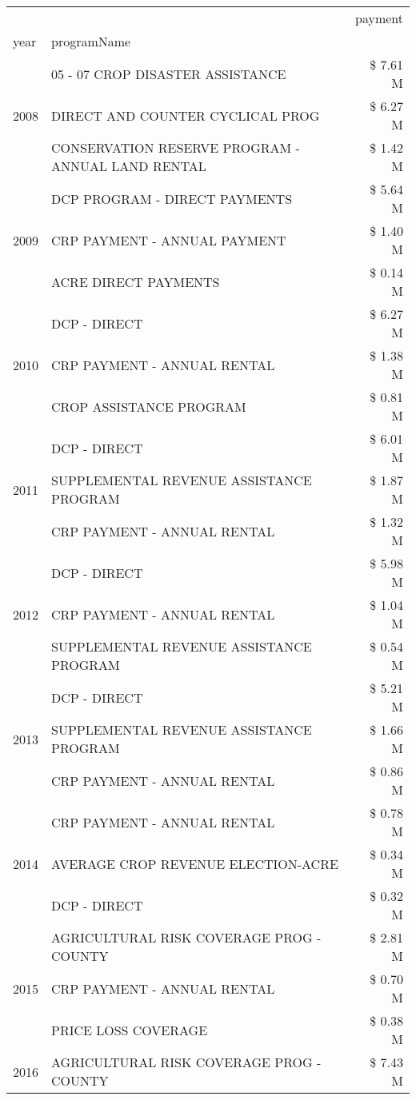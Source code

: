 \begin{tabular}{llr}
\toprule
 &  & payment \\
year & programName &  \\
\midrule
\multirow[t]{3}{*}{2008} & 05 - 07 CROP DISASTER ASSISTANCE & \$ 7.61 M \\
 & DIRECT AND COUNTER CYCLICAL PROG & \$ 6.27 M \\
 & CONSERVATION RESERVE PROGRAM - ANNUAL LAND RENTAL & \$ 1.42 M \\
\cline{1-3}
\multirow[t]{3}{*}{2009} & DCP PROGRAM - DIRECT PAYMENTS & \$ 5.64 M \\
 & CRP PAYMENT - ANNUAL PAYMENT & \$ 1.40 M \\
 & ACRE DIRECT PAYMENTS & \$ 0.14 M \\
\cline{1-3}
\multirow[t]{3}{*}{2010} & DCP - DIRECT & \$ 6.27 M \\
 & CRP PAYMENT - ANNUAL RENTAL & \$ 1.38 M \\
 & CROP ASSISTANCE PROGRAM & \$ 0.81 M \\
\cline{1-3}
\multirow[t]{3}{*}{2011} & DCP - DIRECT & \$ 6.01 M \\
 & SUPPLEMENTAL REVENUE ASSISTANCE PROGRAM & \$ 1.87 M \\
 & CRP PAYMENT - ANNUAL RENTAL & \$ 1.32 M \\
\cline{1-3}
\multirow[t]{3}{*}{2012} & DCP - DIRECT & \$ 5.98 M \\
 & CRP PAYMENT - ANNUAL RENTAL & \$ 1.04 M \\
 & SUPPLEMENTAL REVENUE ASSISTANCE PROGRAM & \$ 0.54 M \\
\cline{1-3}
\multirow[t]{3}{*}{2013} & DCP - DIRECT & \$ 5.21 M \\
 & SUPPLEMENTAL REVENUE ASSISTANCE PROGRAM & \$ 1.66 M \\
 & CRP PAYMENT - ANNUAL RENTAL & \$ 0.86 M \\
\cline{1-3}
\multirow[t]{3}{*}{2014} & CRP PAYMENT - ANNUAL RENTAL & \$ 0.78 M \\
 & AVERAGE CROP REVENUE ELECTION-ACRE & \$ 0.34 M \\
 & DCP - DIRECT & \$ 0.32 M \\
\cline{1-3}
\multirow[t]{3}{*}{2015} & AGRICULTURAL RISK COVERAGE PROG - COUNTY & \$ 2.81 M \\
 & CRP PAYMENT - ANNUAL RENTAL & \$ 0.70 M \\
 & PRICE LOSS COVERAGE & \$ 0.38 M \\
\cline{1-3}
\multirow[t]{3}{*}{2016} & AGRICULTURAL RISK COVERAGE PROG - COUNTY & \$ 7.43 M \\

\end{tabular}
